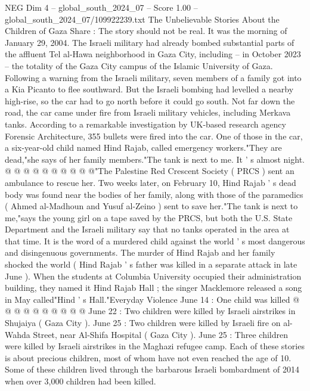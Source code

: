 \begin{textsample}{NEG Dim 4 – global\_south\_2024\_07 – Score 1.00 – global\_south\_2024\_07/109922239.txt}  \label{ex:f4_neg_349}
The Unbelievable Stories About the Children of Gaza Share : The story should not be real.
It was the morning of January 29, 2004.
The Israeli military had already bombed substantial parts of the affluent Tel al-Hawa neighborhood in Gaza City, including -- in October 2023 -- the totality of the Gaza City campus of the Islamic University of Gaza.
Following a warning from the Israeli military, seven members of a family got into a Kia Picanto to flee southward.
But the Israeli bombing had levelled a nearby high-rise, so the car had to go north before it could go south.
Not far down the road, the car came under fire from Israeli military vehicles, including Merkava tanks.
According to a remarkable investigation by UK-based research agency Forensic Architecture, 355 bullets were fired into the car.
One of those in the car, a six-year-old child named Hind Rajab, called emergency workers."They are dead,"she says of her family members."The tank is next to me.
It ' s almost night. @ @ @ @ @ @ @ @ @ @"The Palestine Red Crescent Society ( PRCS ) sent an ambulance to rescue her.
Two weeks later, on February 10, Hind Rajab ' s dead body was found near the bodies of her family, along with those of the paramedics ( Ahmed al-Madhoun and Yusuf al-Zeino ) sent to save her."The tank is next to me,"says the young girl on a tape saved by the PRCS, but both the U.S.
State Department and the Israeli military say that no tanks operated in the area at that time.
It is the word of a murdered child against the world ' s most dangerous and disingenuous governments.
The murder of Hind Rajab and her family shocked the world ( Hind Rajab ' s father was killed in a separate attack in late June ).
When the students at Columbia University occupied their administration building, they named it Hind Rajab Hall ; the singer Macklemore released a song in May called"Hind ' s Hall."Everyday Violence June 14 : One child was killed @ @ @ @ @ @ @ @ @ @ June 22 : Two children were killed by Israeli airstrikes in Shujaiya ( Gaza City ).
June 25 : Two children were killed by Israeli fire on al-Wahda Street, near Al-Shifa Hospital ( Gaza City ).
June 25 : Three children were killed by Israeli airstrikes in the Maghazi refugee camp.
Each of these stories is about precious children, most of whom have not even reached the age of 10.
Some of these children lived through the barbarous Israeli bombardment of 2014 when over 3,000 children had been killed.

\end{textsample}
